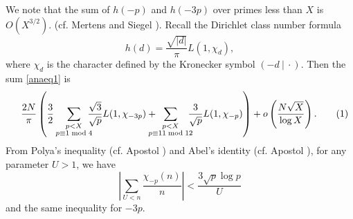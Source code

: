 \documentclass[a4paper, 11pt]{article}
\theoremstyle{plain}
\newcommand{\?}{\textcolor{red}{??}}
\begin{document}
We note that the sum of $h(-p)$ and $h(-3p)$ over primes less than $X$ is $O(X^{3/2})$.
(cf. Mertens \cite{FM} and  Siegel \cite{SI}). 
Recall the Dirichlet class number formula
\[
h(d)=\frac{\sqrt{|d|}}{ \pi}L(1,{\chi}_{d}),
\]
where $\chi_d$ is the character defined by the Kronecker symbol $(-d\ |\ \cdot)$.
Then the sum \eqref{anaeq1} is  
\begin{align*}
\label{anaeq2}
  && \frac{2N}{\pi} \left(  \frac{3}{2}\sum_{\substack{p<X \\ p \equiv 1 \bmod 4}}\!\! \!\! \frac{\sqrt{3}}{\sqrt{p}}L(1,{\chi}_{-3p})+ \!\! \!\! \!\! \sum_{\substack{p<X \\ p \equiv 11\bmod 12 }} \!\! \!\!  \frac{3}{\sqrt{p}}L(1,{\chi}_{-p}) \right) + o \left( \frac{N\sqrt{X}}{\log X} \right).
  \stepcounter{equation}\tag{\theequation} 
\end{align*}
From Polya's inequality (cf. Apostol \cite[Theorem 8.21]{Apo}) and Abel's identity (cf. Apostol \cite[Theorem 4.2]{Apo}), for any parameter $U >1$, we have 
     \[
    \left| \sum_{U< n } \frac{{\chi}_{-p} (n)}{n} \right| < \frac{3\sqrt{p}\log p}{U}
    \]
    and the same inequality for $-3p$. 
\end{document}
